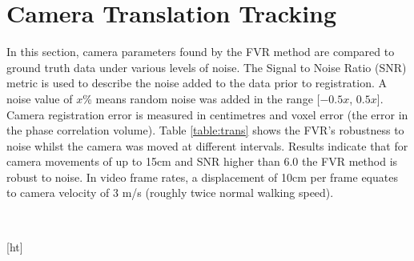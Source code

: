 \section{Camera Translation Tracking}

In this section, camera parameters found by the FVR method are compared to ground truth data under various levels of noise. The Signal to Noise Ratio (SNR) metric is used to describe the noise added to the data prior to registration. A noise value of $x$\% means random noise was added in the range [$-0.5x$, $0.5x$]. Camera registration error is measured in centimetres and voxel error (the error in the phase correlation volume). Table \ref{table:trans} shows the FVR's robustness to noise whilst the camera was moved at different intervals. Results indicate that for camera movements of up to 15cm and SNR higher than 6.0 the FVR method is robust to noise. In video frame rates, a displacement of 10cm per frame equates to camera velocity of 3 m/s (roughly twice normal walking speed).  \\


\begin{table}[ht]
\centering
{}
\\
\caption{Translation Tracking}
\label{table:trans}
\end{table}[ht]


